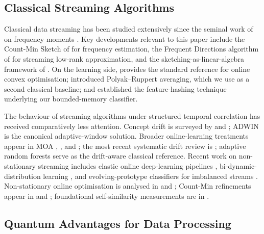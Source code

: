 \documentclass[sensors,article,submit,pdftex,moreauthors]{Definitions/mdpi}
\begin{document}
\subsection{Classical Streaming Algorithms}

Classical data streaming has been studied extensively since the seminal work of \citet{alon1999space} on frequency moments \citep{muthukrishnan2005data}. Key developments relevant to this paper include the Count-Min Sketch of \citet{cormode2005improved} for frequency estimation, the Frequent Directions algorithm of \citet{ghashami2016frequent} for streaming low-rank approximation, and the sketching-as-linear-algebra framework of \citet{woodruff2014sketching}. On the learning side, \citet{shalev2012online} provides the standard reference for online convex optimisation; \citet{polyak1992averaging} introduced Polyak--Ruppert averaging, which we use as a second classical baseline; and \citet{weinberger2009featurehashing} established the feature-hashing technique underlying our bounded-memory classifier.

The behaviour of streaming algorithms under structured temporal correlation has received comparatively less attention. Concept drift is surveyed by \citet{gama2014driftsurvey} and \citet{ditzler2015nonstationary}; ADWIN \citep{bifet2007adwin} is the canonical adaptive-window solution. Broader online-learning treatments appear in MOA \citep{bifet2010moa}, \citet{hoi2021online}, and \citet{gama2010knowledge}; the most recent systematic drift review is \citet{arora2024driftreview}; adaptive random forests \citep{gomes2017adaptiverf} serve as the drift-aware classical reference. Recent work on non-stationary streaming includes elastic online deep-learning pipelines \citep{su2024elasticonline}, bi-dynamic-distribution learning \citep{yan2024bidynamic}, and evolving-prototype classifiers for imbalanced streams \citep{wu2024evolvingprototypes}. Non-stationary online optimisation is analysed in \citet{besbes2015non} and \citet{ben2010agnostic}; Count-Min refinements appear in \citet{benmazziane2022countmin} and \citet{cormode2011synopses}; foundational self-similarity measurements are in \citet{park2000selfsimilar}.

\subsection{Quantum Advantages for Data Processing}
\end{document}
